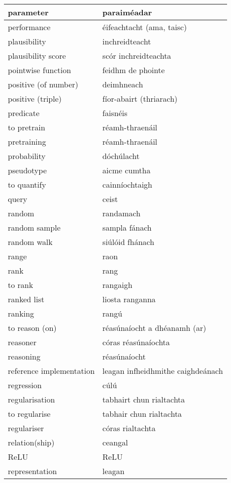 \begin{longtable}{|l|l|}
		parameter&paraiméadar\\ \hline 
		performance&éifeachtacht (ama, taisc)\\ \hline 
		plausibility&inchreidteacht\\ \hline 
		plausibility score&scór inchreidteachta\\ \hline 
		pointwise function&feidhm de phointe\\ \hline 
		positive (of number)&deimhneach\\ \hline 
		positive (triple)&fíor-abairt (thriarach)\\ \hline 
		predicate&faisnéis\\ \hline 
		to pretrain&réamh-thraenáil\\ \hline 
		pretraining&réamh-thraenáil\\ \hline 
		probability&dóchúlacht\\ \hline 
		pseudotype&aicme cumtha\\ \hline 
		to quantify&cainníochtaigh\\ \hline 
		query&ceist\\ \hline 
		random&randamach\\ \hline 
		random sample&sampla fánach\\ \hline 
		random walk&siúlóid fhánach\\ \hline 
		range&raon\\ \hline 
		rank&rang\\ \hline 
		to rank&rangaigh\\ \hline 
		ranked list&liosta ranganna\\ \hline 
		ranking&rangú\\ \hline 
		to reason (on)&réasúnaíocht a dhéanamh (ar)\\ \hline 
		reasoner&córas réasúnaíochta\\ \hline 
		reasoning&réasúnaíocht\\ \hline 
		reference implementation&leagan infheidhmithe caighdeánach\\ \hline 
		regression&cúlú\\ \hline 
		regularisation&tabhairt chun rialtachta\\ \hline 
		to regularise&tabhair chun rialtachta\\ \hline 
		regulariser&córas rialtachta\\ \hline 
		relation(ship)&ceangal\\ \hline 
		ReLU&ReLU\\ \hline 
		representation&leagan\\ \hline 

\end{longtable}
